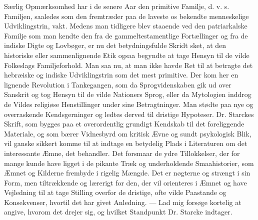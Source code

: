 \documentclass[12pt,a4paper,openany]{book}
\newcommand{\opage}[1]{\marginnote{\footnotesize\textit{[#1]}}}
\begin{document}
Særlig Opmærksomhed har i de senere Aar den primitive
Familje, d. v. s. Familjen, saaledes som den fremtræder paa de
\opage{788}laveste os bekendte menneskelige Udviklingstrin, vakt. Medens
man tidligere blev staaende ved den patriarkalske Familje som
man kendte den fra de gammeltestamentlige Fortællinger og fra
de indiske Digte og Lovbøger, er nu det betydningsfulde Skridt
sket, at den historiske eller sammenlignende Etik ogsaa begyndte
at tage Hensyn til de vilde Folkeslags Familjeforhold. Man saa
nu, at man ikke havde Ret til at betragte det hebræiske og
indiske Udviklingstrin som det mest primitive. Der kom her en
lignende Revolution i Tankegangen, som da Sprogvidenskaben gik
ud over Sanskrit og tog Hensyn til de vilde Nationers Sprog,
eller da Mytologien inddrog de Vildes religiøse Henstillinger under
sine Betragtninger. Man stødte paa nye og overraskende Kendsgerninger
og ledtes derved til dristige Hypoteser. Dr. Starckes
Skrift, som bygges paa et overordentlig grundigt Kendskab til det
foreliggende Materiale, og som bærer Vidnesbyrd om kritisk Ævne
og sundt psykologisk Blik, vil ganske sikkert komme til at indtage
en betydelig Plads i Literaturen om det interessante Æmne,
det behandler. Det forsmaar de ydre Tillokkelser, der for mange
kunde have ligget i de pikante Træk og underholdende Smaahistorier,
som Æmnet og Kilderne frembyde i rigelig Mængde.
Det er nøgterne og strængt i sin Form, men tiltrækkende og lærerigt
for den, der vil orienteres i Æmnet og have Vejledning til at
tage Stilling overfor de dristige, ofte vilde Paastande og Konsekvenser,
hvortil det har givet Anledning. — Lad mig forsøge
kortelig at angive, hvorom det drejer sig, og hvilket Standpunkt
Dr. Starcke indtager.
\end{document}
